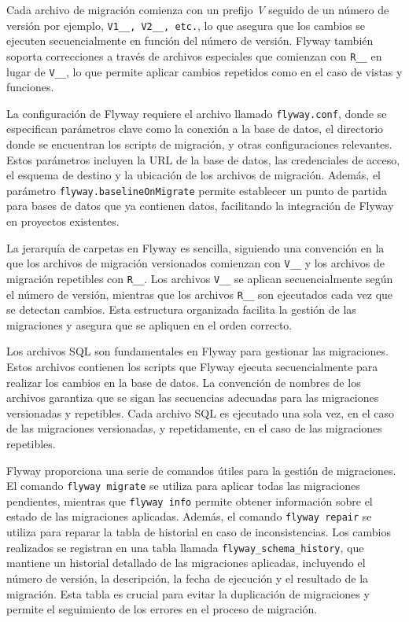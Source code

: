 \documentclass{IEEEtran}
\begin{document}
Cada archivo de migración comienza con un prefijo \textit{V} seguido de un número de versión por ejemplo, \texttt{V1\_\_, V2\_\_, etc.}, lo que asegura que los cambios se ejecuten secuencialmente en función del número de versión. Flyway también soporta correcciones a través de archivos especiales que comienzan con \texttt{R\_\_} en lugar de \texttt{V\_\_}, lo que permite aplicar cambios repetidos como en el caso de vistas y funciones.

La configuración de Flyway requiere el archivo llamado \texttt{flyway.conf}, donde se especifican parámetros clave como la conexión a la base de datos, el directorio donde se encuentran los scripts de migración, y otras configuraciones relevantes. Estos parámetros incluyen la URL de la base de datos, las credenciales de acceso, el esquema de destino y la ubicación de los archivos de migración. Además, el parámetro \texttt{flyway.baselineOnMigrate} permite establecer un punto de partida para bases de datos que ya contienen datos, facilitando la integración de Flyway en proyectos existentes.

La jerarquía de carpetas en Flyway es sencilla, siguiendo una convención en la que los archivos de migración versionados comienzan con \texttt{V\_\_} y los archivos de migración repetibles con \texttt{R\_\_}. Los archivos \texttt{V\_\_} se aplican secuencialmente según el número de versión, mientras que los archivos \texttt{R\_\_} son ejecutados cada vez que se detectan cambios. Esta estructura organizada facilita la gestión de las migraciones y asegura que se apliquen en el orden correcto.

Los archivos SQL son fundamentales en Flyway para gestionar las migraciones. Estos archivos contienen los scripts que Flyway ejecuta secuencialmente para realizar los cambios en la base de datos. La convención de nombres de los archivos garantiza que se sigan las secuencias adecuadas para las migraciones versionadas y repetibles. Cada archivo SQL es ejecutado una sola vez, en el caso de las migraciones versionadas, y repetidamente, en el caso de las migraciones repetibles.

Flyway proporciona una serie de comandos útiles para la gestión de migraciones. El comando \texttt{flyway migrate} se utiliza para aplicar todas las migraciones pendientes, mientras que \texttt{flyway info} permite obtener información sobre el estado de las migraciones aplicadas. Además, el comando \texttt{flyway repair} se utiliza para reparar la tabla de historial en caso de inconsistencias. Los cambios realizados se registran en una tabla llamada \texttt{flyway\_schema\_history}, que mantiene un historial detallado de las migraciones aplicadas, incluyendo el número de versión, la descripción, la fecha de ejecución y el resultado de la migración. Esta tabla es crucial para evitar la duplicación de migraciones y permite el seguimiento de los errores en el proceso de migración. \\
\end{document}
